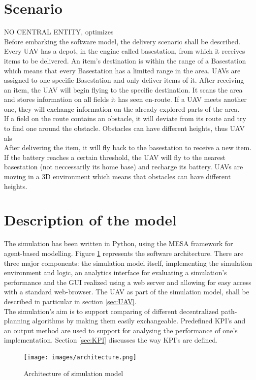 \section{Scenario}
NO CENTRAL ENTITY, optimizes
\\
Before embarking the software model, the delivery scenario shall be described.  Every UAV has a depot, in the engine called basestation, from which it receives items to be delivered. An item's destination is within the range of a Basestation which means that every Basestation has a limited range in the area. UAVs are assigned to one specific Basestation and only deliver items of it. After receiving an item, the UAV will begin flying to the specific destination. It scans the area and stores information on all fields it has seen en-route. If a UAV meets another one, they will exchange information on the already-explored parts of the area.\\
If a field on the route contains an obstacle, it will deviate from its route and try to find one around the obstacle. Obstacles can have different heights, thus UAV als\\
After delivering the item, it will fly back to the basestation to receive a new item. If the battery reaches a certain threshold, the UAV will fly to the nearest basestation (not neccessarily its home base) and recharge its battery. 
 UAVs are moving in a 3D environment which means that obstacles can have different heights.

\section{Description of the model}
The simulation has been written in Python, using the MESA framework for agent-based modelling. Figure \ref{fig:architecture} represents the software architecture. There are three major components: the simulation model itself, implementing the simulation environment and logic, an analytics interface for evaluating a simulation's performance and the GUI realized using a web server and allowing for easy access with a standard web-browser. The UAV as part of the simulation model, shall be described in particular in section \ref{sec:UAV}.\\
The simulation's aim is to support comparing of different decentralized path-planning algorithms by making them easily exchangeable. Predefined KPI's and an output method are used to support for analysing the performance of one's implementation. Section \ref{sec:KPI} discusses the way KPI's are defined.
\begin{figure}[htbp]\label{fig:architecture}
	\centering
	\texttt{[image: images/architecture.png]} 
	\caption{Architecture of simulation model}
\end{figure}

